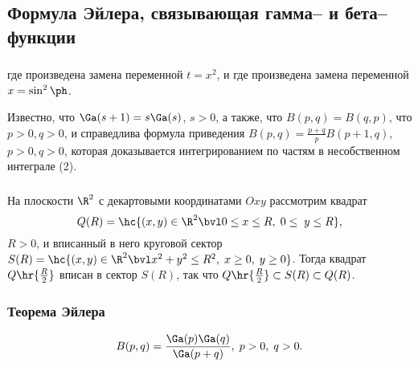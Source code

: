 \documentclass[a4paper]{article}
\begin{document}
\subsection{Формула Эйлера, связывающая гамма-- и бета--функции}
\subsubsection{}

 где
произведена замена переменной $t=x^2$, и  где произведена замена переменной
$x=\sin^2\ph$.

Известно, что $\Ga(s+1)=s\Ga(s)$, $s>0$, а также, что
$B(p,q)=B(q,p)$, что $p>0,q>0$, и справедлива формула приведения
$B(p,q)=\frac{p+q}p B(p+1,q)$, $p>0,q>0$, которая доказывается
интегрированием по частям в несобственном интеграле (2).

\subsubsection{}

На плоскости $\R^2$ с декартовыми координатами $Oxy$ рассмотрим
квадрат $$Q(R) = \hc{(x,y)\in\R^2\bvl 0\le x\le R, \;0\le \;y\le
R},$$ $R>0$, и вписанный в него круговой сектор
$S(R)=\hc{(x,y)\in\R^2\bvl x^2+y^2\le R^2, \;x\ge0,\; y\ge0}$. Тогда
квадрат $Q\hr{\frac{R}2}$ вписан в сектор $S(R)$, так что
$Q\hr{\frac{R}2} \subset S(R)\subset Q(R)$.

\subsubsection{Теорема Эйлера}

$$B(p,q)=\frac{\Ga(p)\Ga(q)}{\Ga(p+q)},\;p>0,\;q>0.$$
\end{document}
